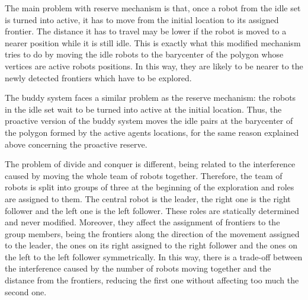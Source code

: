 The main problem with reserve mechanism is that, once a robot from
the idle set is turned into active, it has to move from the initial
location to its assigned frontier. The distance it has to travel may
be lower if the robot is moved to a nearer position while it is still
idle. This is exactly what this modified mechanism tries to do by
moving the idle robots to the barycenter of the polygon whose vertices
are active robots positions. In this way, they are likely to be nearer
to the newly detected frontiers which have to be explored. 

The buddy system faces a similar problem as the reserve mechanism:
the robots in the idle set wait to be turned into active at the initial
location. Thus, the proactive version of the buddy system moves the
idle pairs at the barycenter of the polygon formed by the active agents
locations, for the same reason explained above concerning the proactive
reserve.

The problem of divide and conquer is different, being related to the
interference caused by moving the whole team of robots together. Therefore,
the team of robots is split into groups of three at the beginning
of the exploration and roles are assigned to them. The central robot
is the leader, the right one is the right follower and the left one
is the left follower. These roles are statically determined and never
modified. Moreover, they affect the assignment of frontiers to the
group members, being the frontiers along the direction of the movement
assigned to the leader, the ones on its right assigned to the right
follower and the ones on the left to the left follower symmetrically.
In this way, there is a trade-off between the interference caused
by the number of robots moving together and the distance from the
frontiers, reducing the first one without affecting too much the second
one. 
